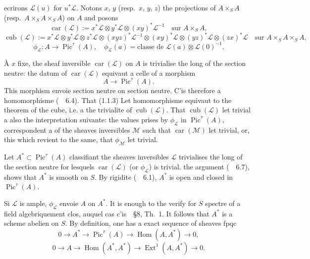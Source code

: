 \documentclass[11pt,a4paper]{article}
\theoremstyle{plain}
\theoremstyle{definition}
\DeclareMathOperator{\Ext}{Ext}
\DeclareMathOperator{\Hom}{Hom}
\DeclareMathOperator{\car}{car}
\DeclareMathOperator{\cub}{cub}
\DeclareMathOperator{\Pic}{Pic}
\begin{document}
ecrirons $\mathscr{L}(u)$ for $u^*\mathscr{L}$. Notons $x$, $y$ (resp.~$x$, $y$, $z$) the projections of $A \times_S A$
(resp.~$A \times_S A \times_S A$) on $A$ and posons
\begin{equation}
\car(\mathscr{L}) := x^*\mathscr{L} \otimes y^*\mathscr{L} \otimes (xy)^*\mathscr{L}^{-1} \quad \text{sur } A \times_S A,
\end{equation}
\begin{equation}
\cub(\mathscr{L}) := x^*\mathscr{L} \otimes y^*\mathscr{L} \otimes z^*\mathscr{L} \otimes (xyz)^*\mathscr{L}^{-1}
\otimes (xy)^*\mathscr{L} \otimes (yz)^*\mathscr{L} \otimes (zx)^*\mathscr{L} \quad \text{sur } A \times_S A \times_S A,
\end{equation}
\begin{equation}
\phi_{\mathscr{L}} : A \longrightarrow \Pic^\tau(A), \quad \phi_{\mathscr{L}}(a) = \text{classe de } \mathscr{L}(a) \otimes \mathscr{L}(0)^{-1}.
\end{equation}

\`A $x$ fixe, the sheaf inversible $\car(\mathscr{L})$ on $A$ is trivialise the long of the section
neutre: the datum of $\car(\mathscr{L})$ equivaut a celle of a morphism
\begin{equation}
A \longrightarrow \Pic^\tau(A).
\end{equation}
This morphism envoie section neutre on section neutre. C'is therefore a
homomorphisme (~\cite{GIT}~6.4). That (1.1.3) Let homomorphisme equivaut to the
theorem of the cube, i.e. a the trivialite of $\cub(\mathscr{L})$. That $\cub(\mathscr{L})$ let trivial a also
the interpretation suivante: the values prises by $\phi_{\mathscr{L}}$ in $\Pic^\tau(A)$, correspondent
a of the sheaves inversibles $\mathscr{M}$ such that $\car(\mathscr{M})$ let trivial, or, this which revient to the
same, that $\phi_{\mathscr{M}}$ let trivial.

Let $A^* \subset \Pic^\tau(A)$ classifiant the sheaves inversibles $\mathscr{L}$ trivialises the long of
the section neutre for lesquels $\car(\mathscr{L})$ (or $\phi_{\mathscr{L}}$) is trivial. the argument (~\cite{GIT}~6.7),
shows that $A^*$ is smooth on $S$. By rigidite (~\cite{GIT}~6.1), $A^*$ is open and closed in
$\Pic^\tau(A)$.

Si $\mathscr{L}$ is ample, $\phi_{\mathscr{L}}$ envoie $A$ on $A^*$. It is enough to the verify for $S$ spectre
of a field algebriquement clos, auquel cas c'is~\cite{AV}~\S8, Th.~1. It follows that
$A^*$ is a scheme abelien on $S$. By definition, one has a exact sequence of
sheaves fpqc
\begin{equation}
0 \longrightarrow A^* \longrightarrow \Pic^\tau(A) \xrightarrow{\quad} \Hom(A, A^*) \longrightarrow 0,
\end{equation}
\begin{equation}
0 \longrightarrow A \xrightarrow{\quad} \Hom(A^*, A^*) \longrightarrow \Ext^1(A, A^*) \longrightarrow 0.
\end{equation}
\end{document}
